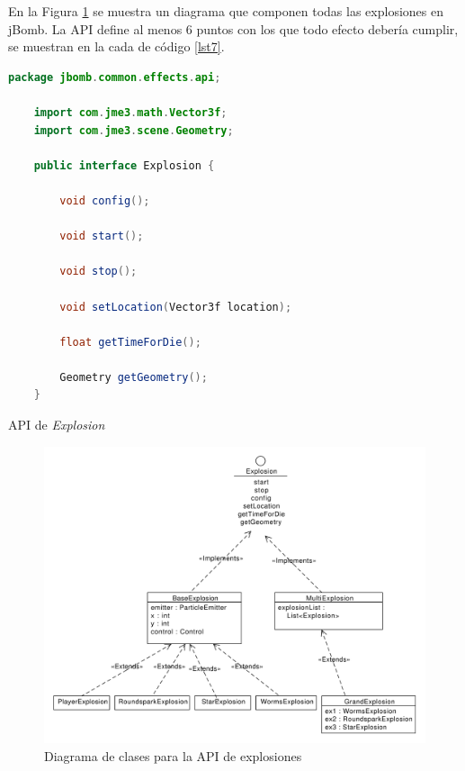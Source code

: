 \documentclass[a4paper,12pt,openany,oneside]{book}
\begin{document}
En la Figura \ref{apilabel} se muestra un diagrama que componen todas las explosiones en jBomb.
La API define al menos 6 puntos con los que todo efecto debería cumplir, se muestran en la cada de código \ref{lst7}.
\begin{codigo}
\begin{lstlisting}[language=Java,frame=single,basicstyle=\scriptsize]
	package jbomb.common.effects.api;

	import com.jme3.math.Vector3f;
	import com.jme3.scene.Geometry;
	
	public interface Explosion {
	    
	    void config();
	    
	    void start();
	    
	    void stop();
	    
	    void setLocation(Vector3f location);
	    
	    float getTimeForDie();
	
	    Geometry getGeometry();
	}
\end{lstlisting}
\caption{API de \textit{Explosion}}
\label{lst7}
\end{codigo}

\begin{figure}
\begin{center}
\includegraphics[scale=0.5]{explosions-diagram.pdf} 
\end{center}
\caption[Diagrama de clases - Explosion API]{Diagrama de clases para la API de explosiones}
\label{apilabel}
\end{figure}
\end{document}
